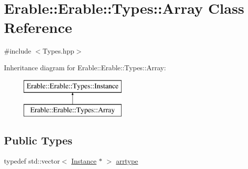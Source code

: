 \hypertarget{class_erable_1_1_erable_1_1_types_1_1_array}{}\section{Erable\+::Erable\+::Types\+::Array Class Reference}
\label{class_erable_1_1_erable_1_1_types_1_1_array}


{\ttfamily \#include $<$Types.\+hpp$>$}

Inheritance diagram for Erable\+::Erable\+::Types\+::Array\+:\begin{figure}[H]
\begin{center}
\leavevmode
\includegraphics[height=2.000000cm]{class_erable_1_1_erable_1_1_types_1_1_array}
\end{center}
\end{figure}
\subsection*{Public Types}
\begin{DoxyCompactItemize}
\item 
typedef std\+::vector$<$ \mbox{\hyperlink{class_erable_1_1_erable_1_1_types_1_1_instance}{Instance}} $\ast$ $>$ \mbox{\hyperlink{class_erable_1_1_erable_1_1_types_1_1_array_ac691ce334c0eea6cfadc7877db148ccf}{arrtype}}
\end{DoxyCompactItemize}

